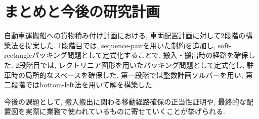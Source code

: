\chapter{まとめと今後の研究計画}\label{conclution}
自動車運搬船への貨物積み付け計画における, 車両配置計画に対して2段階の構築法を提案した. 
1段階目では, sequence-pairを用いた制約を追加し, soft-rectangleパッキング問題として定式化することで, 搬入・搬出時の経路を確保した.  
2段階目では, レクトリニア図形を用いたパッキング問題として定式化し, 駐車時の局所的なスペースを確保した. 
第一段階では整数計画ソルバーを用い, 第二段階ではbottom-left法を用いて解を構築した. 

今後の課題として, 搬入搬出に関わる移動経路確保の正当性証明や, 最終的な配置図を実際に業務で使われているものに寄せていくことが挙げられる. 
